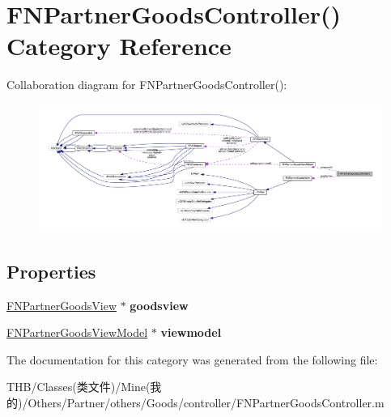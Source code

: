 \hypertarget{category_f_n_partner_goods_controller_07_08}{}\section{F\+N\+Partner\+Goods\+Controller() Category Reference}
\label{category_f_n_partner_goods_controller_07_08}


Collaboration diagram for F\+N\+Partner\+Goods\+Controller()\+:\nopagebreak
\begin{figure}[H]
\begin{center}
\leavevmode
\includegraphics[width=350pt]{category_f_n_partner_goods_controller_07_08__coll__graph}
\end{center}
\end{figure}
\subsection*{Properties}
\begin{DoxyCompactItemize}
\item 
\mbox{\label{category_f_n_partner_goods_controller_07_08_a0e11e6ae610ffcbe154745d81544f0a7}} 
\mbox{\hyperlink{interface_f_n_partner_goods_view}{F\+N\+Partner\+Goods\+View}} $\ast$ {\bfseries goodsview}
\item 
\mbox{\label{category_f_n_partner_goods_controller_07_08_adbc99b934a459e6ef7a72aec4c2fccea}} 
\mbox{\hyperlink{interface_f_n_partner_goods_view_model}{F\+N\+Partner\+Goods\+View\+Model}} $\ast$ {\bfseries viewmodel}
\end{DoxyCompactItemize}


The documentation for this category was generated from the following file\+:\begin{DoxyCompactItemize}
\item 
T\+H\+B/\+Classes(类文件)/\+Mine(我的)/\+Others/\+Partner/others/\+Goods/controller/F\+N\+Partner\+Goods\+Controller.\+m\end{DoxyCompactItemize}
